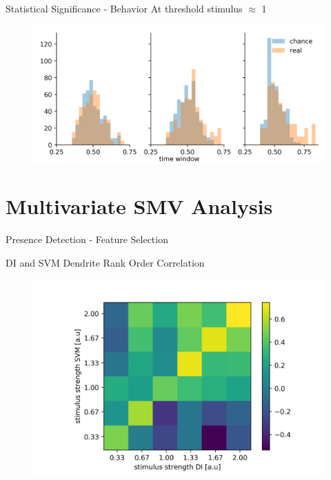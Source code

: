 \documentclass[10pt]{beamer}
\begin{document}
\begin{frame}[fragile]{Statistical Significance - Behavior}
At threshold stimulus $\approx$ 1
\begin{center}
	\begin{figure}
      \includegraphics[width=1.0\textwidth]{statsig_b.png}
	\end{figure}
	\end{center}
\end{frame}

\section{Multivariate SMV Analysis}

\begin{frame}[fragile]{Presence Detection - Feature Selection}


\end{frame}

\begin{frame}[fragile]{DI and SVM Dendrite Rank Order Correlation}
\begin{center}
	\begin{figure}
      \includegraphics[width=1.0\textwidth]{rank_DI_SVM.png}
	\end{figure}
	\end{center}
\end{frame}
\end{document}
